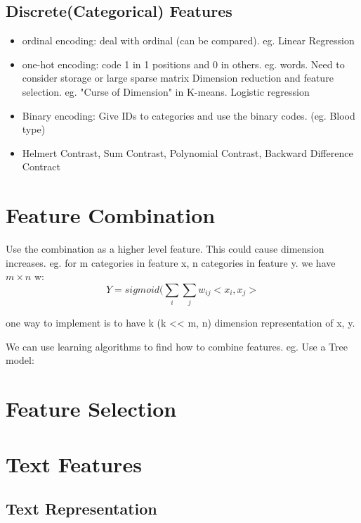 \documentclass[11pt, openany]{book}              %
\begin{document}
\subsection{Discrete(Categorical) Features}

\begin{itemize}
	\item ordinal encoding: deal with ordinal (can be compared). eg. Linear Regression
	\item one-hot encoding: code 1 in 1 positions and 0 in others. eg. words. Need to consider
		\subitem storage or large sparse matrix
		\subitem Dimension reduction and feature selection. eg. "Curse of Dimension" in K-means. Logistic regression
	\item Binary encoding: Give IDs to categories and use the binary codes. (eg. Blood type)
	\item Helmert Contrast, Sum Contrast, Polynomial Contrast, Backward Difference Contract
\end{itemize}

\section{Feature Combination}

Use the combination as a higher level feature. This could cause dimension increases. eg. for m categories in feature x, n categories in feature y. we have $m \times n$ w:
$$Y = sigmoid(\sum_i \sum_j w_{ij} <x_i,x_j>$$

one way to implement is to have k (k << m, n) dimension representation of x, y.

We can use learning algorithms to find how to combine features. eg. Use a Tree model:


\section{Feature Selection}

\section{Text Features}

\subsection{Text Representation}
\end{document}
